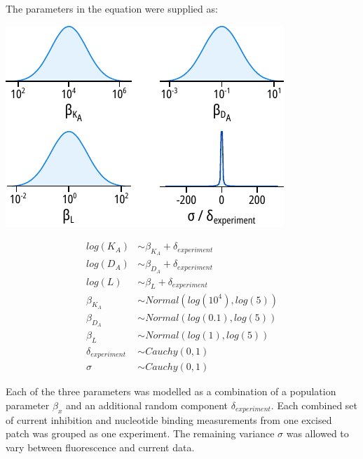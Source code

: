 The parameters in the equation were supplied as:

\begin{minipage}{.5\textwidth}
\centering
\includegraphics[width=\textwidth]{mwc_priors.pdf}
\end{minipage}
\begin{minipage}{.5\textwidth}
\centering
\begin{equation} \label{eq:mwc_priors}
\begin{split}
log(K_A) &\sim \beta_{K_A} + \delta_{experiment} \\
log(D_A) &\sim \beta_{D_A} + \delta_{experiment} \\
log(L) &\sim \beta_{L} + \delta_{experiment} \\
\beta_{K_A} &\sim Normal(log(10^4), log(5)) \\
\beta_{D_A} &\sim Normal(log(0.1), log(5)) \\
\beta_{L} &\sim Normal(log(1), log(5)) \\
\delta_{experiment} &\sim Cauchy(0, 1) \\
\sigma &\sim Cauchy(0, 1)
\end{split}
\end{equation}
\end{minipage}

Each of the three parameters was modelled as a combination of a population parameter $\beta_x$ and an additional random component $\delta_{experiment}$.
Each combined set of current inhibition and nucleotide binding measurements from one excised patch was grouped as one experiment.
The remaining variance $\sigma$ was allowed to vary between fluorescence and current data.

